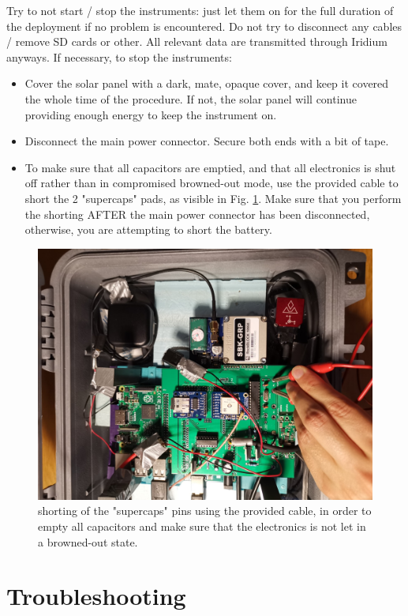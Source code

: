 \documentclass[pdftex,a4paper,12pt,twocolumn,fleqn,captions=tableheading]{scrartcl}
\begin{document}
Try to not start / stop the instruments: just let them on for the full duration of the deployment if no problem is encountered. Do not try to disconnect any cables / remove SD cards or other. All relevant data are transmitted through Iridium anyways. If necessary, to stop the instruments:

\begin{itemize}
  \item Cover the solar panel with a dark, mate, opaque cover, and keep it covered the whole time of the procedure. If not, the solar panel will continue providing enough energy to keep the instrument on.
  \item Disconnect the main power connector. Secure both ends with a bit of tape.
  \item To make sure that all capacitors are emptied, and that all electronics is shut off rather than in compromised browned-out mode, use the provided cable to short the 2 "supercaps" pads, as visible in Fig. \ref{shorting}. Make sure that you perform the shorting AFTER the main power connector has been disconnected, otherwise, you are attempting to short the battery.
\end{itemize}

  \begin{figure}
  \begin{center}
  \includegraphics[width=.8\textwidth]{Figures/shorting}
  \caption{\label{shorting} shorting of the "supercaps" pins using the provided cable, in order to empty all capacitors and make sure that the electronics is not let in a browned-out state.}
  \end{center}
  \end{figure}

\section{Troubleshooting}
\end{document}
